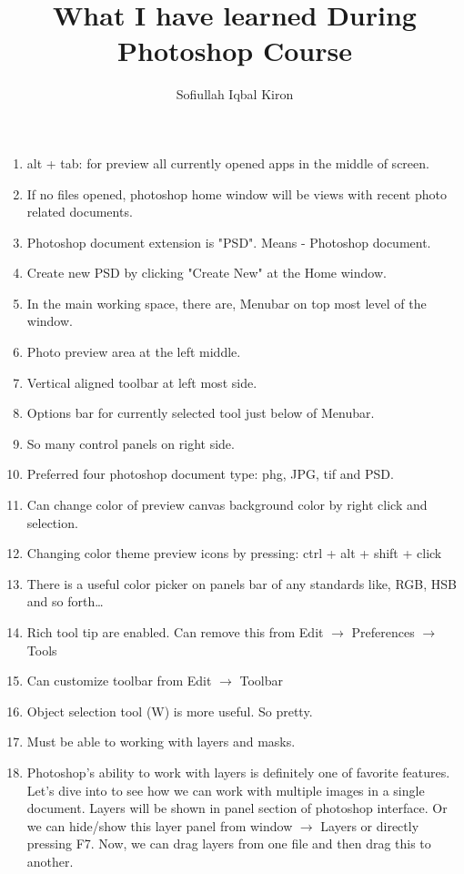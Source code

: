\documentclass[11 pt]{article}
\title{What I have learned During Photoshop Course}
\author{Sofiullah Iqbal Kiron}
\begin{document}
\maketitle
\tableofcontents

\begin{enumerate}
	\item alt + tab: for preview all currently opened apps in the middle of screen.
	\item If no files opened, photoshop home window will be views with recent photo related documents.
	\item Photoshop document extension is "PSD". Means - Photoshop document.
	\item Create new PSD by clicking "Create New" at the Home window.
	\item In the main working space, there are, Menubar on top most level of the window.
	\item Photo preview area at the left middle.
	\item Vertical aligned toolbar at left most side.
	\item Options bar for currently selected tool just below of Menubar.
	\item So many control panels on right side.
	\item Preferred four photoshop document type: phg, JPG, tif and PSD.
	\item Can change color of preview canvas background color by right click and selection.
	\item Changing color theme preview icons by pressing: ctrl + alt + shift + click
	\item There is a useful color picker on panels bar of any standards like, RGB, HSB and so forth\dots
	\item Rich tool tip are enabled. Can remove this from Edit $\rightarrow$ Preferences $\rightarrow$ Tools
	\item Can customize toolbar from Edit $\rightarrow$ Toolbar
	\item Object selection tool (W) is more useful. So pretty.
	\item Must be able to working with layers and masks.
	\item Photoshop's ability to work with layers is definitely one of favorite features. Let's dive into to see how we can work with multiple images in a single document. Layers will be shown in panel section of photoshop interface. Or we can hide/show this layer panel from window $\rightarrow$ Layers or directly pressing  F7. Now, we can drag layers from one file and then drag this to another.

\end{enumerate}
\end{document}
